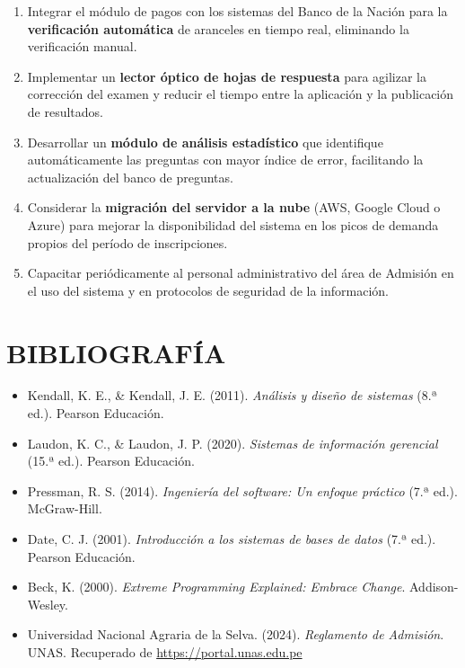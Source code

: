 \documentclass[12pt, a4paper]{report}
\begin{document}
\begin{enumerate}
  \item Integrar el módulo de pagos con los sistemas del Banco de la Nación para la \textbf{verificación automática} de aranceles en tiempo real, eliminando la verificación manual.

  \item Implementar un \textbf{lector óptico de hojas de respuesta} para agilizar la corrección del examen y reducir el tiempo entre la aplicación y la publicación de resultados.

  \item Desarrollar un \textbf{módulo de análisis estadístico} que identifique automáticamente las preguntas con mayor índice de error, facilitando la actualización del banco de preguntas.

  \item Considerar la \textbf{migración del servidor a la nube} (AWS, Google Cloud o Azure) para mejorar la disponibilidad del sistema en los picos de demanda propios del período de inscripciones.

  \item Capacitar periódicamente al personal administrativo del área de Admisión en el uso del sistema y en protocolos de seguridad de la información.
\end{enumerate}


\chapter*{BIBLIOGRAFÍA}

\begin{itemize}[leftmargin=*, label={}]
  \item Kendall, K. E., \& Kendall, J. E. (2011). \textit{Análisis y diseño de sistemas} (8.ª ed.). Pearson Educación.

  \item Laudon, K. C., \& Laudon, J. P. (2020). \textit{Sistemas de información gerencial} (15.ª ed.). Pearson Educación.

  \item Pressman, R. S. (2014). \textit{Ingeniería del software: Un enfoque práctico} (7.ª ed.). McGraw-Hill.

  \item Date, C. J. (2001). \textit{Introducción a los sistemas de bases de datos} (7.ª ed.). Pearson Educación.

  \item Beck, K. (2000). \textit{Extreme Programming Explained: Embrace Change}. Addison-Wesley.

  \item Universidad Nacional Agraria de la Selva. (2024). \textit{Reglamento de Admisión}. UNAS. Recuperado de \url{https://portal.unas.edu.pe}
\end{itemize}
\end{document}

